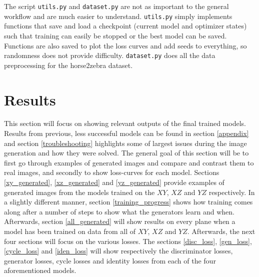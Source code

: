 \documentclass[12pt, fleqn, titlepage]{article}
\begin{document}
The script \texttt{utils.py} and \texttt{dataset.py} are not as important to the general workflow and are much easier to understand. \texttt{utils.py} simply implements functions that save and load a checkpoint (current model and optimizer states) such that training can easily be stopped or the best model can be saved. Functions are also saved to plot the loss curves and add seeds to everything, so randomness does not provide difficulty. \texttt{dataset.py} does all the data preprocessing for the horse2zebra dataset.

\section{Results}\label{results}




This section will focus on showing relevant outputs of the final trained models. Results from previous, less successful models can be found in section \ref{appendix} and section \ref{troubleshooting} highlights some of largest issues during the image generation and how they were solved. The general goal of this section will be to first go through examples of generated images and compare and contrast them to real images, and secondly to show loss-curves for each model. Sections \ref{xy_generated}, \ref{xz_generated} and \ref{yz_generated} provide examples of generated images from the models trained on the $XY$, $XZ$ and $YZ$ respectively. In a slightly different manner, section \ref{training_progress} shows how training comes along after a number of steps to show what the generators learn and when. Afterwards, section \ref{all_generated} will show results on every plane when a model has been trained on data from all of $XY$, $XZ$ and $YZ$. Afterwards, the next four sections will focus on the various losses. The sections \ref{disc_loss}, \ref{gen_loss}, \ref{cycle_loss} and \ref{iden_loss} will show respectively the discriminator losses, generator losses, cycle losses and identity losses from each of the four aforementioned models.
\end{document}
